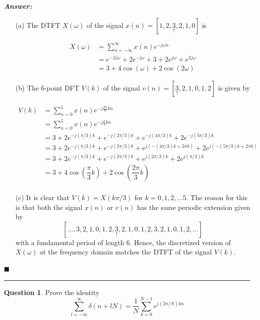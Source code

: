 \documentclass[12pt]{article}
\theoremstyle{definition}
\newtheorem{question}{Question}
\newenvironment{answer}{
    \textbf{\textit{Answer:}} \qquad
}{\hfill $\blacksquare$ \\ \begin{center}
    \rule{0.6\linewidth}{0.5px}    
\end{center}
}
\begin{document}
\begin{answer}
    \begin{enumerate}
        \item[(a)] The DTFT $X(\omega)$ of the signal $x(n) = [1, 2, \underset{\uparrow}{3}, 2, 1, 0]$ is 
        
        \begin{align*}
            X(\omega)
            & = \sum_{n = -\infty}^{\infty} x(n) e^{-j\omega n}\\
            & = e^{-2j\omega} + 2 e^{-j\omega} + 3 + 2e^{j\omega} + e^{2j\omega}\\
            & = 3 + 4\cos(\omega) + 2 \cos(2\omega)
        \end{align*}

        \item[(b)] The $6$-point DFT $V(k)$ of the signal $v(n) = [\underset{\uparrow}{3}, 2, 1, 0, 1, 2]$ is given by 
        
        \begin{align*}
            V(k)
            & = \sum_{n = 0}^5 x(n) e^{-j\frac{2\pi}{6}kn}\\
            & = \sum_{n = 0}^5 x(n) e^{-j\frac{\pi}{3}kn}\\
            & = 3 + 2 e^{-j(\pi/3)k} + e^{-j(2\pi/3)k} + e^{-j(4\pi/3)k} + 2e^{-j(5\pi/3)k}\\
            & = 3 + 2 e^{-j(\pi/3)k} + e^{-j(2\pi/3)k} + e^{j(-(4\pi/3)k + 2\pi k)} + 2e^{j(-(5\pi/3)k + 2\pi k)}\\
            & = 3 + 2 e^{-j(\pi/3)k} + e^{-j(2\pi/3)k} + e^{j(2\pi/3)k} + 2e^{j(\pi/3)k}\\
            & = 3 + 4\cos\left(\dfrac{\pi}{3}k\right) + 2\cos\left(\dfrac{2\pi}{3}k\right)\\
        \end{align*}
        
        \item[(c)] It is clear that $V(k) = X(k\pi/3)$ for $k = 0, 1, 2, \dots 5$. The reason for this is that both the signal $x(n)$ or $v(n)$ has the same periodic extension given by 
        $$[\dots, 3, 2, 1, 0, 1, 2, \underset{\uparrow}{3}, 2, 1, 0, 1, 2, 3, 2, 1, 0, 1, 2, \dots]$$ 
        with a fundamental period of length $6$. Hence, the discretized version of $X(\omega)$ at the frequency domain matches the DTFT of the signal $V(k)$.
    \end{enumerate}
\end{answer}

\begin{question}
    Prove the identity
    $$
    \sum_{l = -\infty}^\infty \delta(n + lN) = \dfrac{1}{N} \sum_{k = 0}^{N-1} e^{j(2\pi / N)kn}
    $$
\end{question}
\end{document}
